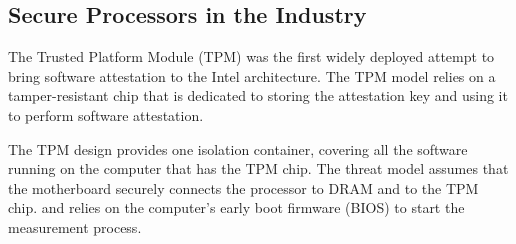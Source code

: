 \subsection{Secure Processors in the Industry}

The Trusted Platform Module (TPM) \cite{grawrock2003tpm} was the first widely
deployed attempt to bring software attestation to the Intel architecture. The
TPM model relies on a tamper-resistant chip that is dedicated to storing the
attestation key and using it to perform software attestation.

The TPM design provides one isolation container, covering all the software
running on the computer that has the TPM chip. The threat model assumes that
the motherboard securely connects the processor to DRAM and to the TPM chip.
and relies on the computer's early boot firmware (BIOS) to start the
measurement process.

